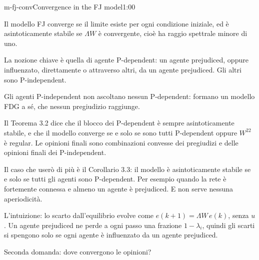 \begin{slide}{m-fj-conv}{Convergence in the FJ model}{1:00}
  \begin{discorso}
    \item Il modello FJ converge se il limite esiste per ogni condizione iniziale, ed è asintoticamente stabile se $\Lambda W$ è convergente, cioè ha raggio spettrale minore di uno.
    \item La nozione chiave è quella di agente P-dependent: un agente prejudiced, oppure influenzato, direttamente o attraverso altri, da un agente prejudiced. Gli altri sono P-independent.
    \item Gli agenti P-independent non ascoltano nessun P-dependent: formano un modello FDG a sé, che nessun pregiudizio raggiunge.
    \item Il Teorema 3.2 dice che il blocco dei P-dependent è sempre asintoticamente stabile, e che il modello converge se e solo se sono tutti P-dependent oppure $W^{22}$ è regular. Le opinioni finali sono combinazioni convesse dei pregiudizi e delle opinioni finali dei P-independent.
    \item Il caso che userò di più è il Corollario 3.3: il modello è asintoticamente stabile se e solo se tutti gli agenti sono P-dependent. Per esempio quando la rete è fortemente connessa e almeno un agente è prejudiced. E non serve nessuna aperiodicità.
    \item L'intuizione: lo scarto dall'equilibrio evolve come $e(k+1)=\Lambda W\,e(k)$, senza $u$. Un agente prejudiced ne perde a ogni passo una frazione $1-\lambda_i$, quindi gli scarti si spengono solo se ogni agente è influenzato da un agente prejudiced.
    \item Seconda domanda: dove convergono le opinioni?
  \end{discorso}
\end{slide}

